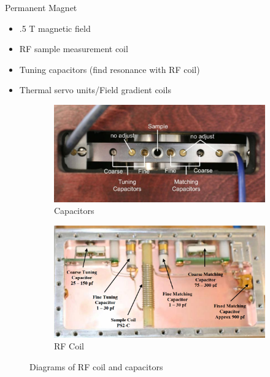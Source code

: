 \documentclass[aspectratio=169,xcolor=dvipsnames]{beamer}
\begin{document}
\begin{frame}{Permanent Magnet}
    \begin{itemize}
        \item .5 T magnetic field
        \item RF sample measurement coil
        \item Tuning capacitors (find resonance with RF coil)
        \item Thermal servo units/Field gradient coils 
    \end{itemize}

    \begin{figure}
        \centering
        \begin{subfigure}{0.35\linewidth}
            \includegraphics[width = \linewidth]{figs/above.png}
            \caption{Capacitors}
        \end{subfigure}
        \begin{subfigure}{0.3\linewidth}
            \includegraphics[width = \linewidth]{figs/coils.png}
            \caption{RF Coil}
        \end{subfigure}
        \caption{Diagrams of RF coil and capacitors}\label{fig:coils}
    \end{figure}
\end{frame}
\end{document}
